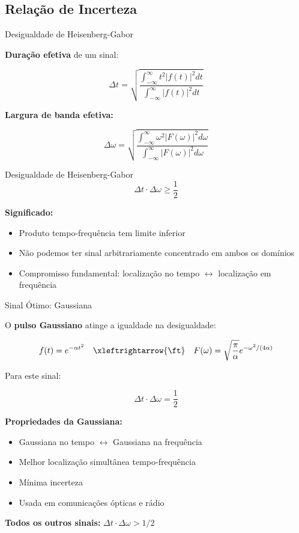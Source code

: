 
\subsection{Relação de Incerteza}

\begin{frame}{Desigualdade de Heisenberg-Gabor}

\textbf{Duração efetiva} de um sinal:

\[
\Delta t = \sqrt{\frac{\int_{-\infty}^{\infty} t^2 |f(t)|^2 dt}{\int_{-\infty}^{\infty} |f(t)|^2 dt}}
\]

\textbf{Largura de banda efetiva:}

\[
\Delta \omega = \sqrt{\frac{\int_{-\infty}^{\infty} \omega^2 |F(\omega)|^2 d\omega}{\int_{-\infty}^{\infty} |F(\omega)|^2 d\omega}}
\]

\begin{block}{Desigualdade de Heisenberg-Gabor}
\[
\Delta t \cdot \Delta \omega \geq \frac{1}{2}
\]
\end{block}

\textbf{Significado:}

\begin{itemize}
\item Produto tempo-frequência tem limite inferior
\item Não podemos ter sinal arbitrariamente concentrado em ambos os domínios
\item Compromisso fundamental: localização no tempo $\leftrightarrow$ localização em frequência
\end{itemize}

\end{frame}


\begin{frame}{Sinal Ótimo: Gaussiana}

O \textbf{pulso Gaussiano} atinge a igualdade na desigualdade:

\[
f(t) = e^{-\alpha t^2} \quad \xleftrightarrow{\ft} \quad F(\omega) = \sqrt{\frac{\pi}{\alpha}} e^{-\omega^2/(4\alpha)}
\]

Para este sinal:

\[
\Delta t \cdot \Delta \omega = \frac{1}{2}
\]

\textbf{Propriedades da Gaussiana:}

\begin{itemize}
\item Gaussiana no tempo $\leftrightarrow$ Gaussiana na frequência
\item Melhor localização simultânea tempo-frequência
\item Mínima incerteza
\item Usada em comunicações ópticas e rádio
\end{itemize}

\vspace{0.1cm}

\textbf{Todos os outros sinais:} $\Delta t \cdot \Delta \omega > 1/2$

\end{frame}

